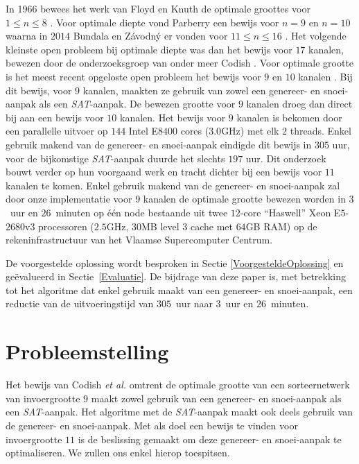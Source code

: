 \documentclass{article}
\begin{document}
In 1966 bewees het werk van Floyd en Knuth de optimale groottes voor $1 \leq n \leq 8$ \cite{FloydKnuth}.
Voor optimale diepte vond Parberry een bewijs voor $n = 9$ en $n = 10$ waarna in $2014$ Bundala en Z\'avodn\'y er vonden voor $11 \leq n \leq 16$ \cite{Parberry,BundalaZavodny}.
Het volgende kleinste open probleem bij optimale diepte was dan het bewijs voor $17$ kanalen, bewezen door de onderzoeksgroep van onder meer Codish \cite{CodishBackAgain}.
Voor optimale grootte is het meest recent opgeloste open probleem het bewijs voor $9$ en $10$ kanalen \cite{sortingNetworksSize2014}.
Bij dit bewijs, voor $9$ kanalen, maakten ze gebruik van zowel een genereer- en snoei-aanpak als een \textit{SAT}-aanpak. 
De bewezen grootte voor $9$ kanalen droeg dan direct bij aan een bewijs voor $10$ kanalen. Het bewijs voor $9$ kanalen is bekomen door een parallelle uitvoer op $144$ Intel E$8400$ cores ($3.0$GHz) met elk $2$ threads.
Enkel gebruik makend van de genereer- en snoei-aanpak eindigde dit bewijs in $305$ uur, voor de bijkomstige \textit{SAT}-aanpak duurde het slechts $197$ uur. 
Dit onderzoek bouwt verder op hun voorgaand werk en tracht dichter bij een bewijs voor $11$ kanalen te komen.
Enkel gebruik makend van de genereer- en snoei-aanpak zal door onze implementatie voor $9$ kanalen de optimale grootte bewezen worden in $3$~uur en $26$~minuten op \'e\'en node bestaande uit twee $12$-core ``Haswell'' Xeon E$5$-$2680$v$3$ processoren ($2.5$GHz, $30$MB level $3$ cache met $64$GB RAM) op de rekeninfrastructuur van het Vlaamse Supercomputer Centrum.

De voorgestelde oplossing wordt besproken in Sectie \ref{VoorgesteldeOplossing} en ge\"evalueerd in Sectie~\ref{Evaluatie}.
De bijdrage van deze paper is, met betrekking tot het algoritme dat enkel gebruik maakt van een genereer- en snoei-aanpak, een reductie van de uitvoeringstijd van $305$~uur naar $3$~uur en $26$~minuten.
%

\section{Probleemstelling}\label{probleemstelling}
Het bewijs van Codish \textit{et al.} \cite{sortingNetworksSize2014} omtrent de optimale grootte van een sorteernetwerk van invoergrootte $9$ maakt zowel gebruik van een genereer- en snoei-aanpak als een \textit{SAT}-aanpak.
Het algoritme met de \textit{SAT}-aanpak maakt ook deels gebruik van de genereer- en snoei-aanpak.
Met als doel een bewijs te vinden voor invoergrootte $11$ is de beslissing gemaakt om deze genereer- en snoei-aanpak te optimaliseren.
We zullen ons enkel hierop toespitsen.
\end{document}
